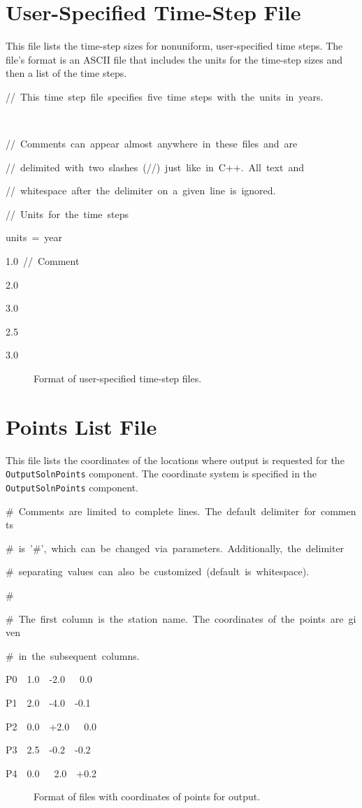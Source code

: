 \section{\label{sec:FileFormat:TimeStepUser}User-Specified Time-Step File}

This file lists the time-step sizes for nonuniform, user-specified
time steps. The file's format is an ASCII file that includes the units
for the time-step sizes and then a list of the time steps. 
\begin{lyxcode}
//~This~time~step~file~specifies~five~time~steps~with~the~units~in~years.

~

//~Comments~can~appear~almost~anywhere~in~these~files~and~are

//~delimited~with~two~slashes~(//)~just~like~in~C++.~All~text~and~

//~whitespace~after~the~delimiter~on~a~given~line~is~ignored.



//~Units~for~the~time~steps

units~=~year



1.0~//~Comment

2.0

3.0

2.5

3.0
\end{lyxcode}
\begin{figure}[H]
\caption{Format of user-specified time-step files.}
\end{figure}



\section{\label{sec:FileFormat:PointsList}Points List File}

This file lists the coordinates of the locations where output is requested
for the \texttt{OutputSolnPoints} component. The coordinate system
is specified in the \texttt{OutputSolnPoints} component. 
\begin{lyxcode}
\#~Comments~are~limited~to~complete~lines.~The~default~delimiter~for~comments

\#~is~'\#',~which~can~be~changed~via~parameters.~Additionally,~the~delimiter~

\#~separating~values~can~also~be~customized~(default~is~whitespace).

\#

\#~The~first~column~is~the~station~name.~The~coordinates~of~the~points~are~given

\#~in~the~subsequent~columns.

P0~~1.0~~-2.0~~~0.0

P1~~2.0~~-4.0~~-0.1

P2~~0.0~~+2.0~~~0.0

P3~~2.5~~-0.2~~-0.2~

P4~~0.0~~~2.0~~+0.2
\end{lyxcode}
\begin{figure}[H]
\caption{Format of files with coordinates of points for output.}
\end{figure}

